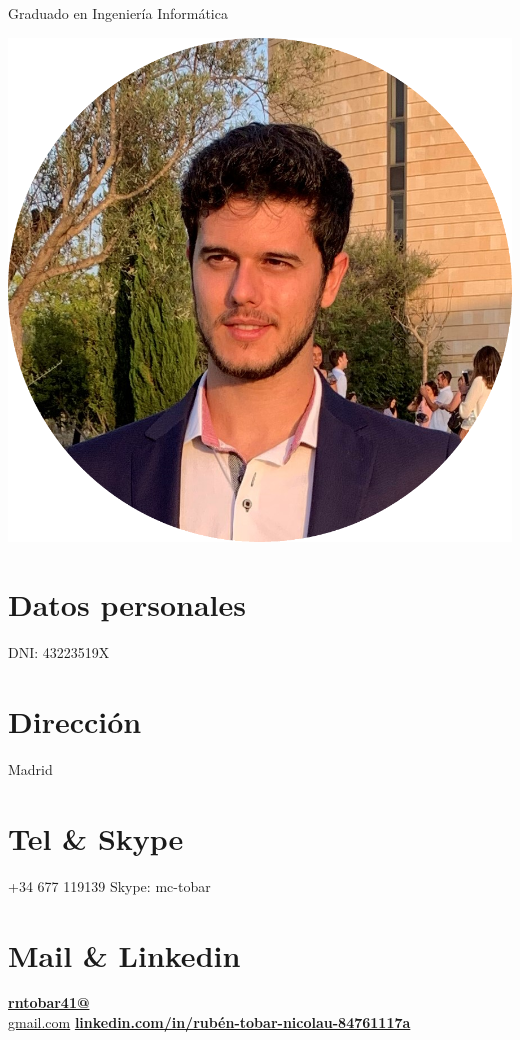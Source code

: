 \documentclass[]{friggeri-cv}
\begin{document}
      {Graduado en Ingeniería Informática}
      

\begin{aside}
  \includegraphics[scale=0.17]{img/yo.png}
  \section{Datos personales}
    DNI: 43223519X
    ~
  \section{Dirección}
    Madrid
    ~
  \section{Tel \& Skype}
    +34 677 119139
    Skype: mc-tobar
    ~
  \section{Mail \& Linkedin}
    \href{mailto:rntobar41@gmail.com}{\textbf{rntobar41@}\\gmail.com}
    \href{https://www.linkedin.com/in/rubén-tobar-nicolau-84761117a}{\textbf{linkedin.com/in/rubén-tobar-nicolau-84761117a}}
    ~

\end{aside}
\end{document}
